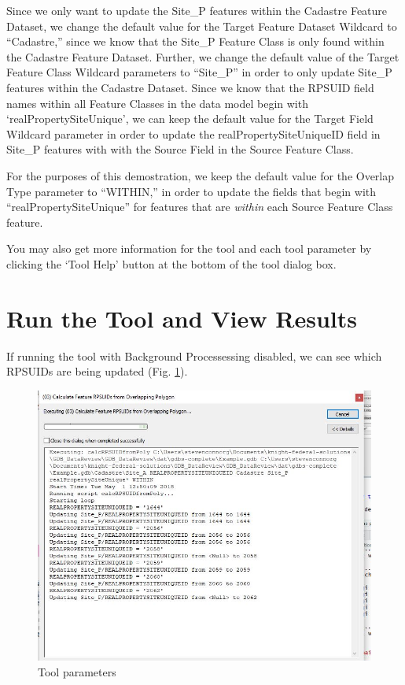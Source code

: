 \documentclass[openany]{book}
\theoremstyle{definition}
\theoremstyle{definition}
\theoremstyle{definition}
\theoremstyle{remark}
\begin{document}
Since we only want to update the Site\_P features within the Cadastre
Feature Dataset, we change the default value for the Target Feature
Dataset Wildcard to ``Cadastre,'' since we know that the Site\_P Feature
Class is only found within the Cadastre Feature Dataset. Further, we
change the default value of the Target Feature Class Wildcard parameters
to ``Site\_P'' in order to only update Site\_P features within the
Cadastre Dataset. Since we know that the RPSUID field names within all
Feature Classes in the data model begin with `realPropertySiteUnique',
we can keep the default value for the Target Field Wildcard parameter in
order to update the realPropertySiteUniqueID field in Site\_P features
with with the Source Field in the Source Feature Class.

For the purposes of this demostration, we keep the default value for the
Overlap Type parameter to ``WITHIN,'' in order to update the fields that
begin with ``realPropertySiteUnique'' for features that are
\emph{within} each Source Feature Class feature.

You may also get more information for the tool and each tool parameter
by clicking the `Tool Help' button at the bottom of the tool dialog box.

\section{Run the Tool and View
Results}\label{run-the-tool-and-view-results-2}

If running the tool with Background Processessing disabled, we can see
which RPSUIDs are being updated (Fig. \ref{fig:sjcmessages}).

\begin{figure}[H]

{\centering \includegraphics{figures/spatjoinCalc-toolmessages} 

}

\caption{Tool parameters}\label{fig:sjcmessages}
\end{figure}
\end{document}
